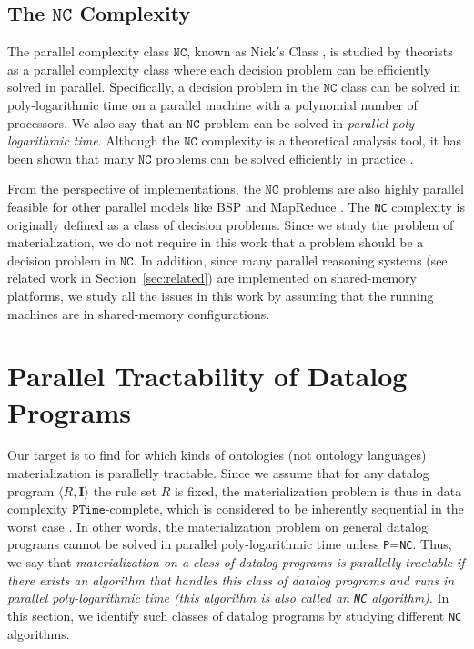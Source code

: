 \documentclass[final,1p,times]{elsarticle}
\begin{document}
\subsection{The $\texttt{NC}$ Complexity}

The parallel complexity class $\texttt{NC}$, known as Nick$'$s
Class \cite{Raymond95}, is studied by theorists as a parallel complexity class
where each decision problem can be efficiently solved in parallel.
Specifically, a decision problem in the $\texttt{NC}$ class
can be solved in poly-logarithmic time on a parallel machine with a polynomial number of processors.
We also say that an $\texttt{NC}$ problem can be solved in \emph{parallel poly-logarithmic time}.
Although the $\texttt{NC}$ complexity is a theoretical analysis tool,
it has been shown that many $\texttt{NC}$ problems can be solved efficiently in practice \cite{Raymond95}.

From the perspective of implementations, the $\texttt{NC}$ problems are also highly
parallel feasible for other parallel models like BSP \cite{Valiant90}
and MapReduce \cite{KarloffSV10}. The \texttt{NC} complexity is originally defined
as a class of decision problems. Since we study the problem of materialization, we do not
require in this work that a problem should be a decision problem in $\texttt{NC}$.
In addition, since many parallel reasoning systems (see related work in Section~\ref{sec:related})
are implemented on shared-memory platforms, we
study all the issues in this work by assuming that the running machines are in
shared-memory configurations.


\section{Parallel Tractability of Datalog Programs}
\label{sec:ptclass}

Our target is to find for which kinds of ontologies (not ontology languages)
materialization is parallelly tractable.
Since we assume that for any datalog program $\langle R, \textbf{I}\rangle$ the rule
set $R$ is fixed, the materialization problem is thus in data complexity
$\texttt{PTime}$-complete, which is considered to be inherently sequential in the worst
case \cite{Raymond95}. In other words, the materialization problem on general
datalog programs cannot be solved in parallel poly-logarithmic time unless \texttt{P}=\texttt{NC}.
Thus, we say that \emph{materialization on a class of datalog programs is parallelly tractable
if there exists an algorithm that handles this class of datalog programs and runs in parallel
poly-logarithmic time (this algorithm is also called an \texttt{NC} algorithm)}.
In this section, we identify such classes of datalog programs by studying different \texttt{NC} algorithms.
\end{document}
